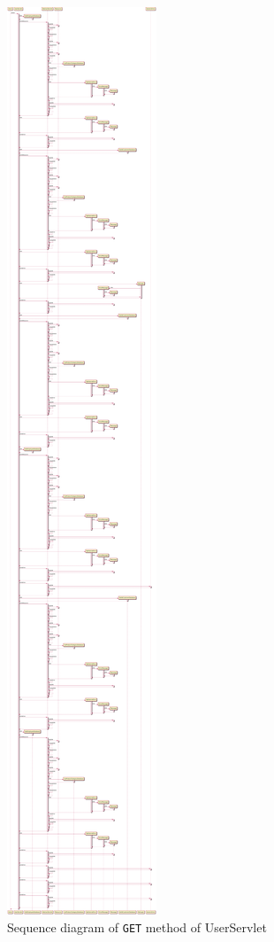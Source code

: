 \begin{figure}[H]
    \centering
    \includegraphics[width=\textwidth,height=0.9\textheight,keepaspectratio]{Schemas/UserServlet_doGet.svg.pdf}
    \caption{Sequence diagram of \texttt{GET} method of UserServlet}
    \label{fig:UserServlet_doGet}
\end{figure}
